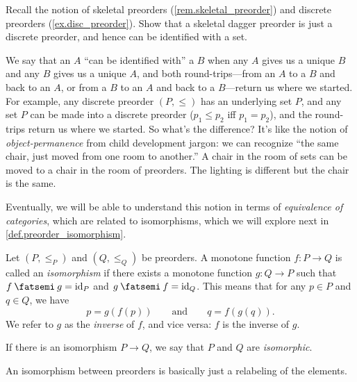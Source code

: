 \documentclass[7Sketches]{subfiles}
\begin{document}
\begin{exercise}%
\label{exc.skeletal_dagger_preorder}%
Recall the notion of skeletal preorders (\cref{rem.skeletal_preorder}) and discrete preorders
(\cref{ex.disc_preorder}). Show that a skeletal dagger preorder is just a discrete preorder, and hence can be identified with a set.%
\end{exercise}
\begin{remark}
  We say that an $A$ ``can be identified with'' a $B$ when any $A$ gives us a unique $B$ and any $B$ gives us a unique $A$, and both round-trips---from an $A$ to a $B$ and back to an $A$, or from a $B$ to an $A$ and back to a $B$---return us where we started. For example, any discrete preorder $(P,\leq)$ has an underlying set $P$, and any set $P$ can be made into a discrete preorder ($p_1\leq p_2$ iff $p_1=p_2$), and the round-trips return us where we started. So what's the difference? It's like the notion of \emph{object-permanence} from child development jargon: we can recognize ``the same chair, just moved from one room to another.'' A chair in the room of sets can be moved to a chair in the room of preorders. The lighting is different but the chair is the same.

Eventually, we will be able to understand this notion in terms of \emph{equivalence of categories}, which are related to isomorphisms, which we will explore next in \cref{def.preorder_isomorphism}.
\end{remark}

\begin{definition}%
\label{def.preorder_isomorphism}%
Let $(P,\leq_P)$ and $(Q,\leq_Q)$ be preorders. A monotone function $f\colon P\to Q$ is called an \emph{isomorphism} if there exists a monotone function $g\colon Q\to P$ such that $f\cp g=\id_P$ and $g\cp f=\id_Q$. This means that for any $p\in P$ and $q\in Q$, we have
\[
	p= g(f(p))
	\qquad\text{and}\qquad
	q=f(g(q)).
\]
We refer to $g$ as the \emph{inverse} of $f$, and vice versa: $f$ is the inverse of $g$.

If there is an isomorphism $P\to Q$, we say that $P$ and $Q$ are \emph{isomorphic}.
\end{definition}

An isomorphism between preorders is basically just a relabeling of the elements.
\end{document}
